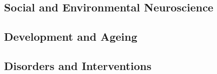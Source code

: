 \subsection*{Social and Environmental Neuroscience}

% 
% 
% 
% 
% 
% 
% 
% 
% 
% 
% 
% 
% 
% 
% 
\newpage

\subsection*{Development and Ageing}

% 
% 
% 
% 
% 
% 
% 

\subsection*{Disorders and Interventions}

% 
% 
% 
% 
% 
% 
% 
% 
% 
% 
% 
% 
% 
% 
% 
% 
% 
% 

